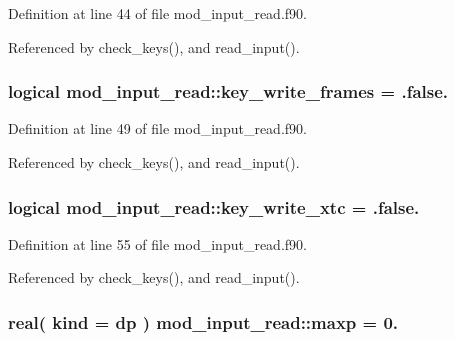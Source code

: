 Definition at line 44 of file mod\+\_\+input\+\_\+read.\+f90.



Referenced by check\+\_\+keys(), and read\+\_\+input().

\subsubsection[{\texorpdfstring{key\+\_\+write\+\_\+frames}{key_write_frames}}]{\setlength{\rightskip}{0pt plus 5cm}logical mod\+\_\+input\+\_\+read\+::key\+\_\+write\+\_\+frames = .false.}\hypertarget{namespacemod__input__read_a54f4396af49b6cf2c5a16f000fa7369b}{}\label{namespacemod__input__read_a54f4396af49b6cf2c5a16f000fa7369b}


Definition at line 49 of file mod\+\_\+input\+\_\+read.\+f90.



Referenced by check\+\_\+keys(), and read\+\_\+input().

\subsubsection[{\texorpdfstring{key\+\_\+write\+\_\+xtc}{key_write_xtc}}]{\setlength{\rightskip}{0pt plus 5cm}logical mod\+\_\+input\+\_\+read\+::key\+\_\+write\+\_\+xtc = .false.}\hypertarget{namespacemod__input__read_a3af1716773b868648513ab784756e599}{}\label{namespacemod__input__read_a3af1716773b868648513ab784756e599}


Definition at line 55 of file mod\+\_\+input\+\_\+read.\+f90.



Referenced by check\+\_\+keys(), and read\+\_\+input().

\subsubsection[{\texorpdfstring{maxp}{maxp}}]{\setlength{\rightskip}{0pt plus 5cm}real( kind = dp ) mod\+\_\+input\+\_\+read\+::maxp = 0.}\hypertarget{namespacemod__input__read_a52849ceaebc993cf06d473c80bdf92ac}{}\label{namespacemod__input__read_a52849ceaebc993cf06d473c80bdf92ac}


